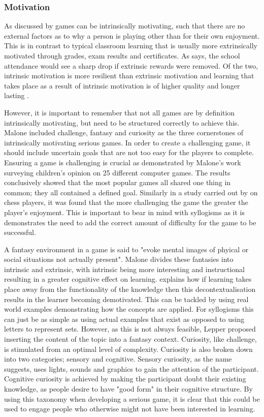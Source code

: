\documentclass[12pt,a4paper]{report}
\begin{document}
\subsubsection{Motivation}
As discussed by \cite{malone1981toward} games can be intrinsically motivating, such that there are no external factors as to why a person is playing other than for their own enjoyment. This is in contrast to typical classroom learning that is usually more extrinsically motivated through grades, exam results and certificates. As  \cite{csikszentmihalyi1997talented} says, the school attendance would see a sharp drop if extrinsic rewards were removed. Of the two, intrinsic motivation is more resilient than extrinsic motivation and learning that takes place as a result of intrinsic motivation is of higher quality and longer lasting \citep{kawachi2003initiating}.

However, it is important to remember that not all games are by definition intrinsically motivating, but need to be structured correctly to achieve this. Malone included challenge, fantasy and curiosity as the three cornerstones of intrinsically motivating serious games.  
In order to create a challenging game, it should include uncertain goals that are not too easy for the players to complete. Ensuring a game is challenging is crucial as demonstrated by Malone's work surveying children's opinion on 25 different computer games. The results conclusively showed that the most popular games all shared one thing in common; they all contained a defined goal.  Similarly in a study carried out by \cite{abuhamdeh2012importance} on chess players, it was found that the more challenging the game the greater the player's enjoyment. This is important to bear in mind with syllogisms as it is demonstrates the need to add the correct amount of difficulty for the game to be successful.

A fantasy environment in a game is said to "evoke mental images of phyical or social situations not actually present". Malone divides these fantasies into intrinsic and extrinsic, with intrinsic being more interesting and instructional resulting in a  greater cognitive effect on learning. \cite{lepper1988motivational} explains how if learning takes place away from the functionality of the knowledge then this decontextualisation results in the learner becoming demotivated.  This can be tackled by using real world examples demonstrating how the concepts are applied. For syllogisms this can just be as simple as using actual examples that exist as opposed to using letters to represent sets. However, as this is not always feasible, Lepper proposed inserting the content of the topic into a fantasy context.
Curiosity, like challenge, is stimulated from an optimal level of complexity. Curiosity is also broken down into two categories; sensory and cognitive.  Sensory curiosity, as the name suggests, uses lights, sounds and graphics to gain the attention of the participant. Cognitive curiosity is achieved by making the participant doubt their existing knowledge, as people desire to have "good form" in their cognitive structure.   By using this taxonomy when developing a serious game, it is clear that this could be used to engage people who otherwise might not have been interested in learning. 
\end{document}
